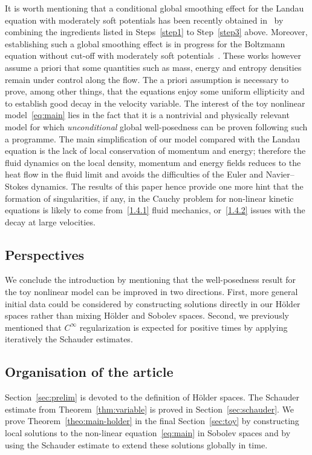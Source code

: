 \documentclass[10pt]{amsart}
\theoremstyle{definition}\newtheorem{defi}[theo]{Definition}\newtheorem{rema}[theo]{Remark}\newtheorem{exam}[theo]{Example}\newtheorem{exem}[theo]{Example}\newtheorem{nota}[theo]{Notation}
\begin{document}
It is worth mentioning that a conditional global smoothing effect for the Landau equation with moderately soft potentials has been recently obtained in~\cite{hs} by combining the ingredients listed in Steps~\ref{step1} to Step~\ref{step3} above. Moreover, establishing such a global smoothing effect is in progress for the Boltzmann equation without cut-off with moderately soft potentials~\cite{bootstrap}. These works however assume a priori that some quantities such as mass, energy and entropy densities remain under control along the flow. The a priori assumption is necessary to prove, among other things, that the equations enjoy some uniform ellipticity and to establish good decay in the velocity variable. The interest of the toy nonlinear model~\eqref{eq:main} lies in the fact that it is a nontrivial and physically relevant model for which \emph{unconditional} global well-posedness can be proven following such a programme. The main simplification of our model compared with the Landau equation is the lack of local conservation of momentum and energy; therefore the fluid dynamics on the local density, momentum and energy fields reduces to the heat flow in the fluid limit and avoids the difficulties of the Euler and Navier--Stokes dynamics. The results of this paper hence provide one more hint that the formation of singularities, if any, in the Cauchy problem for non-linear kinetic equations is likely to come from~\eqref{1.4.1} fluid mechanics, or~\eqref{1.4.2} issues with the decay at large velocities.

\subsection{Perspectives}

We conclude the introduction by mentioning that the well-posedness result for the toy nonlinear model can be improved in two directions. First, more general initial data could be considered by constructing solutions directly in our H\"older spaces rather than mixing H\"older and Sobolev spaces. Second, we previously mentioned that $C^\infty$ regularization is expected for positive times by applying iteratively the Schauder estimates.

\subsection{Organisation of the article}

Section~\ref{sec:prelim} is devoted to the definition of H\"older spaces. The Schauder estimate from Theorem~\ref{thm:variable} is proved in Section~\ref{sec:schauder}. We prove Theorem~\ref{theo:main-holder} in the final Section~\ref{sec:toy} by constructing local solutions to the non-linear equation~\eqref{eq:main} in Sobolev spaces and by using the Schauder estimate to extend these solutions globally in time.
\end{document}
